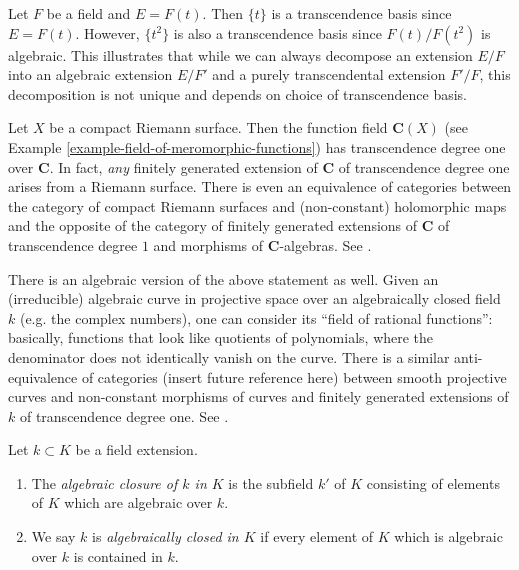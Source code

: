 \begin{example}
\label{example-function-field-not-unique-transcendence-basis}
Let $F$ be a field and $E = F(t)$. Then $\{t\}$ is a
transcendence basis since $E = F(t)$. However, $\{t^2\}$
is also a transcendence basis since $F(t)/F(t^2)$ is algebraic.
This illustrates that while we can always decompose an extension
$E/F$ into an algebraic extension $E/F'$ and a
purely transcendental extension $F'/F$, this decomposition is not unique and
depends on choice of transcendence basis.
\end{example}

\begin{example}
\label{example-riemann-surface-transcendence}
Let $X$ be a compact Riemann surface. Then the function field
$\mathbf{C}(X)$ (see Example \ref{example-field-of-meromorphic-functions})
has transcendence degree one over $\mathbf{C}$. In fact, {\it any}
finitely generated extension of $\mathbf{C}$ of transcendence degree
one arises from a Riemann surface. There is even an equivalence of
categories between the category of compact Riemann surfaces and
(non-constant) holomorphic maps and the opposite of the category of finitely
generated extensions of $\mathbf{C}$ of transcendence degree $1$
and morphisms of $\mathbf{C}$-algebras. See \cite{Forster}.

\medskip\noindent
There is an algebraic version of the above statement as well. Given an
(irreducible) algebraic curve in projective space over an algebraically
closed field $k$ (e.g. the complex numbers), one can consider its
``field of rational functions'': basically, functions that look like
quotients of polynomials, where the denominator does not identically
vanish on the curve. There is a similar anti-equivalence of categories
(insert future reference here) between smooth projective curves and
non-constant morphisms of curves and finitely generated extensions of $k$ of
transcendence degree one. See \cite{H}.
\end{example}

\begin{definition}
\label{definition-algebraically-closed-in}
Let $k \subset K$ be a field extension.
\begin{enumerate}
\item The {\it algebraic closure of $k$ in $K$} is the subfield
$k'$ of $K$ consisting of elements of $K$ which are algebraic over $k$.
\item We say $k$ is {\it algebraically closed in $K$} if
every element of $K$ which is algebraic over $k$ is
contained in $k$.
\end{enumerate}
\end{definition}


